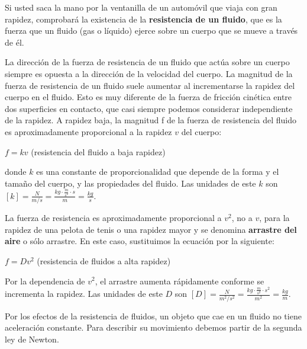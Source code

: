 \documentclass{article}
\newcommand{\bl}[1]{\textbf{#1}}
\newcommand{\definicion}[1]{%
    \vspace{0.5cm}
    \begin{definicionbox}
        #1
    \end{definicionbox}
    \vspace{0.5cm}
}
\begin{document}
    \par Si usted saca la mano por la ventanilla de un automóvil que viaja con gran rapidez, comprobará la existencia de la \bl{resistencia de un fluido}, que es la fuerza que un fluido (gas o líquido) ejerce sobre un cuerpo que se mueve a través de él.

    \par La dirección de la fuerza de resistencia de un fluido que actúa sobre un cuerpo siempre es opuesta a la dirección de la velocidad del cuerpo. La magnitud de la fuerza de resistencia de un fluido suele aumentar al incrementarse la rapidez del cuerpo en el fluido. Esto es muy diferente de la fuerza de fricción cinética entre dos superficies en contacto, que casi siempre podemos considerar independiente de la rapidez. A rapidez baja, la magnitud f de la fuerza de resistencia del fluido es aproximadamente proporcional a la rapidez $v$ del cuerpo:

    \definicion{ 
        \centering
        $f = k v$ \quad \quad (resistencia del fluido a baja rapidez)
        }

    
    \noindent donde $k$ es una constante de proporcionalidad que depende de la forma y el tamaño del cuerpo, y las propiedades del fluido. Las unidades de este $k$ son $ [k] = \frac{N}{m/s} = \frac{kg \cdot \frac{m}{s^2} \cdot s }{m} = \frac{kg}{s}$.

    \par La fuerza de resistencia es aproximadamente proporcional a $v^2$, no a $v$, para la rapidez de una pelota de tenis o una rapidez mayor y se denomina \bl{arrastre del aire} o sólo arrastre. En este caso, sustituimos la ecuación por la siguiente:

    \definicion{
        \centering
        $f = D v^2$ \quad \quad (resistencia de fluidos a alta rapidez)
    }

    \par Por la dependencia de $v^2$, el arrastre aumenta rápidamente conforme se incrementa la rapidez. Las unidades de este $D$ son $ [D] = \frac{N}{m^2/s^2} = \frac{kg \cdot \frac{m}{s^2} \cdot s^2 }{m^2} = \frac{kg}{m}$.

    \vspace{0.5cm}

    \par Por los efectos de la resistencia de fluidos, un objeto que cae en un fluido no tiene aceleración constante. Para describir su movimiento debemos partir de la segunda ley de Newton.

    \vspace{2cm}
\end{document}
